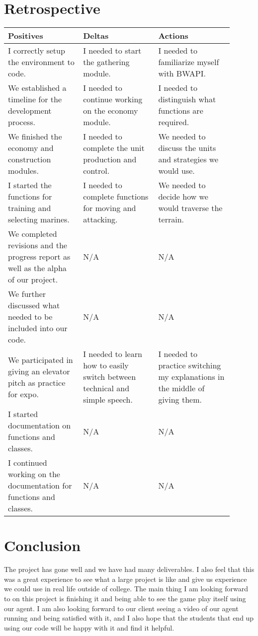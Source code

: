 \documentclass[10pt,letterpaper,onecolumn,draftclsnofoot]{IEEEtran}
\begin{document}
\section{Retrospective}
\begin{center}
	\begin{tabular}{ |p{0.3\linewidth}|p{0.3\linewidth}|p{0.3\linewidth}| } 
		\hline
		Positives & Deltas & Actions \\
		\hline
		I correctly setup the environment to code. & I needed to start the gathering module. & I needed to familiarize myself with BWAPI. \\
		\hline
		We established a timeline for the development process. & I needed to continue working on the economy module. & I needed to distinguish what functions are required. \\
		\hline
		We finished the economy and construction modules. & I needed to complete the unit production and control. & We needed to discuss the units and strategies we would use. \\
		\hline
		I started the functions for training and selecting marines. & I needed to complete functions for moving and attacking. & We needed to decide how we would traverse the terrain. \\
		\hline
		 We completed revisions and the progress report as well as the alpha of our project. & N/A & N/A \\ 
		\hline
		We further discussed what needed to be included into our code. & N/A & N/A \\ 
		\hline
		We participated in giving an elevator pitch as practice for expo. & I needed to learn how to easily switch between technical and simple speech. & I needed to practice switching my explanations in the middle of giving them. \\ 
		\hline
		 I started documentation on functions and classes. & N/A & N/A \\
		\hline
		 I continued working on the documentation for functions and classes. & N/A & N/A \\
		\hline
	\end{tabular}
\end{center}

\section{Conclusion}
The project has gone well and we have had many deliverables. I also feel that this was a great experience to see what a large project is like and give us experience we could use in real life outside of college. The main thing I am looking forward to on this project is finishing it and being able to see the game play itself using our agent. I am also looking forward to our client seeing a video of our agent running and being satisfied with it, and I also hope that the students that end up using our code will be happy with it and find it helpful.
\end{document}

